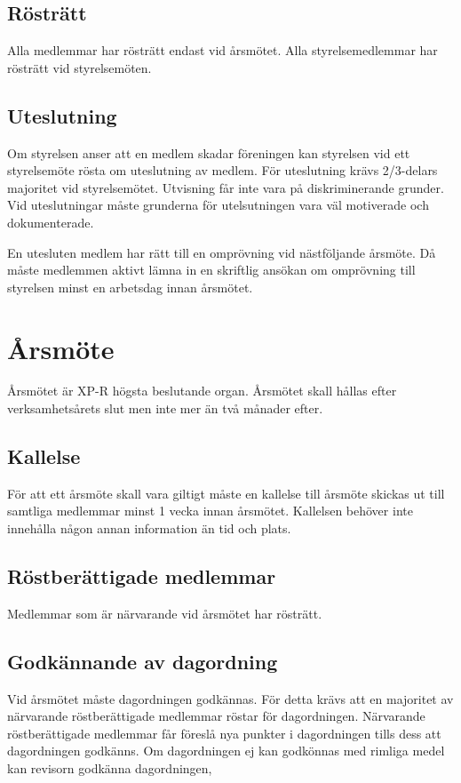\documentclass{article}
\begin{document}
\subsection{Rösträtt}
Alla medlemmar har rösträtt endast vid årsmötet. Alla styrelsemedlemmar har rösträtt vid styrelsemöten.

\subsection{Uteslutning}
Om styrelsen anser att en medlem skadar föreningen kan styrelsen vid ett styrelsemöte rösta om uteslutning av medlem. För uteslutning krävs 2/3-delars majoritet vid styrelsemötet. Utvisning får inte vara på diskriminerande grunder. Vid uteslutningar måste grunderna för utelsutningen vara väl motiverade och dokumenterade. 

En utesluten medlem har rätt till en omprövning vid nästföljande årsmöte. Då måste medlemmen aktivt lämna in en skriftlig ansökan om omprövning till styrelsen minst en arbetsdag innan årsmötet.


\section{Årsmöte}
Årsmötet är XP-R högsta beslutande organ.
Årsmötet skall hållas efter verksamhetsårets slut men inte mer än två månader efter.
\subsection{Kallelse}
För att ett årsmöte skall vara giltigt måste en kallelse till årsmöte skickas ut till samtliga medlemmar minst 1 vecka innan årsmötet. Kallelsen behöver inte innehålla någon annan information än tid och plats.
\subsection{Röstberättigade medlemmar}
Medlemmar som är närvarande vid årsmötet har rösträtt.

\subsection{Godkännande av dagordning}
Vid årsmötet måste dagordningen godkännas. För detta krävs att en majoritet av närvarande röstberättigade medlemmar röstar för dagordningen. Närvarande röstberättigade medlemmar får föreslå nya punkter i dagordningen tills dess att dagordningen godkänns. Om dagordningen ej kan godkönnas med rimliga medel kan revisorn godkänna dagordningen,
\end{document}
